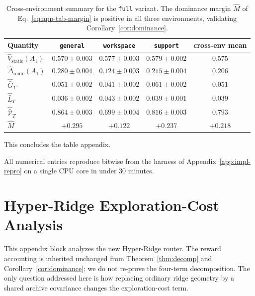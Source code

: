 \documentclass{article} %
\begin{document}
\begin{table}[h]
\centering
\small
\begin{tabular}{lcccc}
\toprule
Quantity & \texttt{general} & \texttt{workspace} & \texttt{support} & cross-env mean \\
\midrule
$\widehat V_{\mathrm{static}}(A_1)$    & $0.570\pm 0.003$ & $0.577\pm 0.003$ & $0.579\pm 0.002$ & $0.575$ \\
$\widehat\Delta_{\mathrm{route}}(A_1)$   & $0.280\pm 0.004$ & $0.124\pm 0.003$ & $0.215\pm 0.004$ & $0.206$ \\
$\widehat{\bar G}_T$                   & $0.051\pm 0.002$ & $0.041\pm 0.002$ & $0.061\pm 0.002$ & $0.051$ \\
$\widehat{\bar L}_T$                   & $0.036\pm 0.002$ & $0.043\pm 0.002$ & $0.039\pm 0.001$ & $0.039$ \\
$\widehat{\bar{\mathcal V}}_T$         & $0.864\pm 0.003$ & $0.699\pm 0.004$ & $0.816\pm 0.003$ & $0.793$ \\
$\widehat M$                           & $+0.295$ & $+0.122$ & $+0.237$ & $+0.218$ \\
\bottomrule
\end{tabular}
\caption{Cross-environment summary for the \texttt{full} variant. The dominance margin $\widehat M$ of Eq.~\eqref{eq:app-tab-margin} is positive in all three environments, validating Corollary~\ref{cor:dominance}.}
\label{tab:app-summary}
\end{table}

This concludes the table appendix.

All numerical entries reproduce bitwise from the harness of Appendix~\ref{app:impl-repro} on a single CPU core in under $30$ minutes.

\clearpage

\section{Hyper-Ridge Exploration-Cost Analysis}
\label{app:proofs}
\label{app:hyper-proofs}

This appendix block analyzes the new Hyper-Ridge router.  The reward accounting is inherited unchanged from Theorem~\ref{thm:decomp} and Corollary~\ref{cor:dominance}; we do not re-prove the four-term decomposition.  The only question addressed here is how replacing ordinary ridge geometry by a shared archive covariance changes the exploration-cost term.
\end{document}
